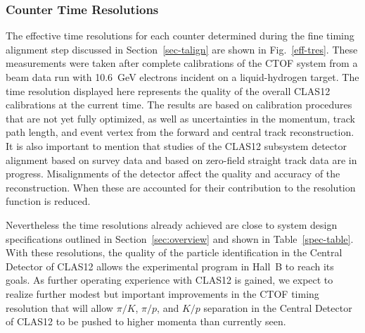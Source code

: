 \documentclass{elsart}
\begin{document}
\subsubsection{Counter Time Resolutions}
\label{tres-beam}

The effective time resolutions for each counter determined during the fine timing alignment step
discussed in Section~\ref{sec-talign} are shown in Fig.~\ref{eff-tres}. These measurements were
taken after complete calibrations of the CTOF system from a beam data run with 10.6~GeV electrons
incident on a liquid-hydrogen target. The time resolution displayed here represents the quality of the
overall CLAS12 calibrations at the current time. The results are based on calibration procedures that
are not yet fully optimized, as well as uncertainties in the momentum, track path length, and event vertex
from the forward and central track reconstruction. It is also important to mention that studies of the
CLAS12 subsystem detector alignment based on survey data and based on zero-field straight track data
are in progress. Misalignments of the detector affect the quality and accuracy of the reconstruction.
When these are accounted for their contribution to the resolution function is reduced.

Nevertheless the time resolutions already achieved are close to system design specifications outlined in
Section~\ref{sec:overview} and shown in Table~\ref{spec-table}. With these resolutions, the quality of the
particle identification in the Central Detector of CLAS12 allows the experimental program in Hall~B to reach
its goals. As further operating experience with CLAS12 is gained, we expect to realize further modest but
important improvements in the CTOF timing resolution that will allow $\pi/K$, $\pi/p$, and $K/p$ separation
in the Central Detector of CLAS12 to be pushed to higher momenta than currently seen.
\end{document}
